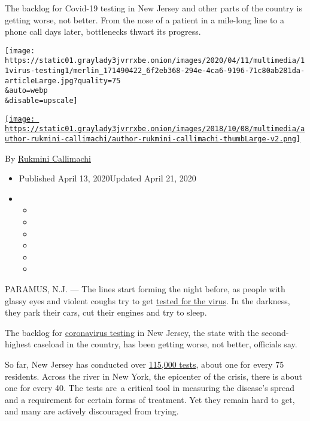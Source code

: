 The backlog for Covid-19 testing in New Jersey and other parts of the
country is getting worse, not better. From the nose of a patient in a
mile-long line to a phone call days later, bottlenecks thwart its
progress.

\texttt{[image: https://static01.graylady3jvrrxbe.onion/images/2020/04/11/multimedia/11virus-testing1/merlin\_171490422\_6f2eb368-294e-4ca6-9196-71c80ab281da-articleLarge.jpg?quality=75\\\&auto=webp\\\&disable=upscale]}

\href{https://www.nytimes3xbfgragh.onion/by/rukmini-callimachi}{\texttt{[image: https://static01.graylady3jvrrxbe.onion/images/2018/10/08/multimedia/author-rukmini-callimachi/author-rukmini-callimachi-thumbLarge-v2.png]}}

By
\href{https://www.nytimes3xbfgragh.onion/by/rukmini-callimachi}{Rukmini
Callimachi}

\begin{itemize}
\item
  Published April 13, 2020Updated April 21, 2020
\item
  \begin{itemize}
  \item
  \item
  \item
  \item
  \item
  \item
  \end{itemize}
\end{itemize}

PARAMUS, N.J. --- The lines start forming the night before, as people
with glassy eyes and violent coughs try to get
\href{https://www.nytimes3xbfgragh.onion/2020/04/21/health/fda-in-home-test-coronavirus.html}{tested
for the virus}. In the darkness, they park their cars, cut their engines
and try to sleep.

The backlog for
\href{https://www.nytimes3xbfgragh.onion/2020/04/21/health/fda-in-home-test-coronavirus.html}{coronavirus
testing} in New Jersey, the state with the second-highest caseload in
the country, has been getting worse, not better, officials say.

So far, New Jersey has conducted over
\href{https://www.nj.gov/health/cd/topics/covid2019_dashboard.shtml}{115,000
tests}, about one for every 75 residents. Across the river in New York,
the epicenter of the crisis, there is about one for every 40. The tests
are~a critical tool in measuring the disease's spread and a requirement
for certain forms of treatment. Yet they remain hard to get, and many
are actively discouraged from trying.

